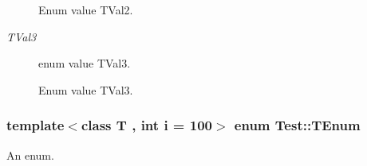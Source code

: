 \begin{Desc}
\begin{description}
Enum value T\-Val2. \item[{\em 
\hypertarget{classTest_ad8d13fe56b896633273087859b89a1a3a5642b0033d6d17c4c9bee72133059f26}{T\-Val3}\label{classTest_ad8d13fe56b896633273087859b89a1a3a5642b0033d6d17c4c9bee72133059f26}
}]enum value T\-Val3.

Enum value T\-Val3. \end{description}
\end{Desc}
\hypertarget{classTest_ad8d13fe56b896633273087859b89a1a3}{
\subsubsection[{T\-Enum}]{\setlength{\rightskip}{0pt plus 5cm}template$<$class T , int i = 100$>$ enum {\bf Test\-::\-T\-Enum}}}\label{classTest_ad8d13fe56b896633273087859b89a1a3}


An enum. 


